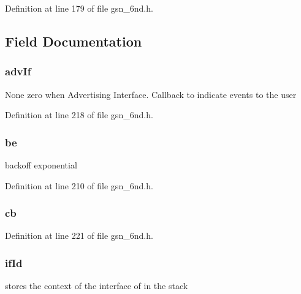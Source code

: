 Definition at line 179 of file gsn\_\-6nd.h.



\subsection{Field Documentation}
\hypertarget{a00194_a0847f9ba2c5ad3d017a322e7d4130523}{
\subsubsection[{advIf}]{ {\bf advIf}}}
\label{a00194_a0847f9ba2c5ad3d017a322e7d4130523}
None zero when Advertising Interface. Callback to indicate events to the user 

Definition at line 218 of file gsn\_\-6nd.h.

\hypertarget{a00194_adef8b71e042c787edf9b47fdad356ed4}{
\subsubsection[{be}]{ {\bf be}}}
\label{a00194_adef8b71e042c787edf9b47fdad356ed4}
backoff exponential 

Definition at line 210 of file gsn\_\-6nd.h.

\hypertarget{a00194_a8bde91b6ce377d59f0b80c03bdd469b9}{
\subsubsection[{cb}]{ {\bf cb}}}
\label{a00194_a8bde91b6ce377d59f0b80c03bdd469b9}


Definition at line 221 of file gsn\_\-6nd.h.

\hypertarget{a00194_a0f9aaec90ed26330a798d110bc4bc237}{
\subsubsection[{ifId}]{ {\bf ifId}}}
\label{a00194_a0f9aaec90ed26330a798d110bc4bc237}
stores the context of the interface of in the stack 

